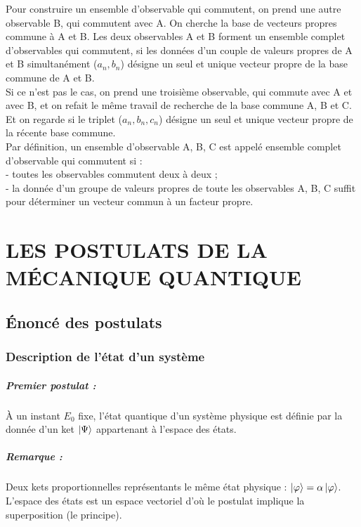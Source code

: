 \documentclass[12pt,a4paper,titlepage]{book}
\begin{document}
Pour construire un ensemble d'observable qui commutent, on prend une autre observable B, qui commutent avec A. On cherche la base de vecteurs propres commune à A et B. Les deux observables A et B forment un ensemble complet d'observables qui commutent, si les données d'un couple de valeurs propres de A et B simultanément ($a_n, b_n$) désigne un seul et unique vecteur propre de la base commune de A et B.\\

Si ce n'est pas le cas, on prend une troisième observable, qui commute avec A et avec B, et on refait le même travail de recherche de la base commune A, B et C. Et on regarde si le triplet ($a_n, b_n, c_n$) désigne un seul et unique vecteur propre de la récente base commune.\\

Par définition, un ensemble d'observable A, B, C est appelé ensemble complet d'observable qui commutent si :\\
- toutes les observables commutent deux à deux ;\\
- la donnée d'un groupe de valeurs propres de toute les observables A, B, C suffit pour déterminer un vecteur commun à un facteur propre.

\chapter{LES POSTULATS DE LA MÉCANIQUE QUANTIQUE}
\section{Énoncé des postulats}
\subsection{Description de l'état d'un système}
\paragraph*{Premier postulat :}

À un instant $E_0$ fixe, l'état quantique d'un système physique est définie par la donnée d'un ket $\ket \Psi$ appartenant à l'espace des états.

\paragraph*{Remarque :}

Deux kets proportionnelles représentants le même état physique : $\ket \varphi = \alpha \ket \varphi$. L'espace des états est un espace vectoriel d'où le postulat implique la superposition (le principe).
\end{document}
